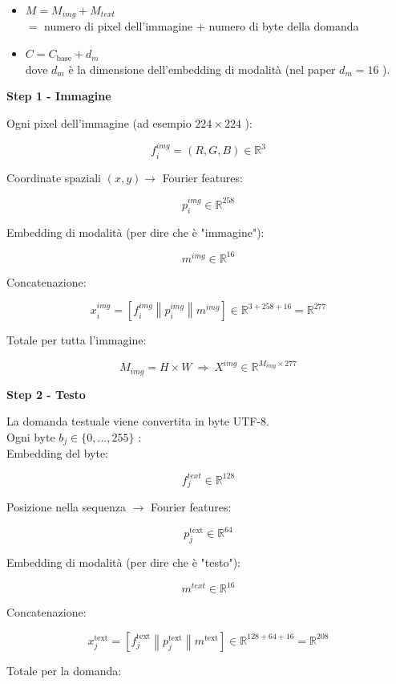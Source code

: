 \documentclass[
  11pt,
]{article}
\begin{document}
\begin{itemize}
\item
  \(M = M_{img} + M_{text}\)\\
  \(=\) numero di pixel dell'immagine + numero di byte
  della domanda
\item
  \(C = C_{\text{base}} + d_{m}\)\\
  dove \(d_{m}\) è la dimensione dell'embedding di
  modalità (nel paper \(d_{m} = 16\) ).
\end{itemize}

\textbf{Step 1 - Immagine}

Ogni pixel dell'immagine (ad esempio \(224 \times 224\)
):

\[f_{i}^{img} = (R,G,B) \in \mathbb{R}^{3}\]

Coordinate spaziali \((x,y) \rightarrow\) Fourier features:

\[p_{i}^{img} \in \mathbb{R}^{258}\]

Embedding di modalità (per dire che è "immagine"):

\[m^{img} \in \mathbb{R}^{16}\]

Concatenazione:

\[x_{i}^{img} = \left\lbrack f_{i}^{img}\left\| p_{i}^{img} \right\| m^{img} \right\rbrack \in \mathbb{R}^{3 + 258 + 16} = \mathbb{R}^{277}\]

Totale per tutta l'immagine:

\[M_{img} = H \times W\  \Rightarrow \ X^{img} \in \mathbb{R}^{M_{img} \times 277}\]

\textbf{Step 2 - Testo}

La domanda testuale viene convertita in byte UTF-8.\\
Ogni byte \(b_{j} \in \{ 0,\ldots,255\}\) :\\
Embedding del byte:

\[f_{j}^{text} \in \mathbb{R}^{128}\]

Posizione nella sequenza \(\rightarrow\) Fourier features:

\[p_{j}^{\text{text}} \in \mathbb{R}^{64}\]

Embedding di modalità (per dire che è "testo"):

\[m^{text} \in \mathbb{R}^{16}\]

Concatenazione:

\[x_{j}^{\text{text}} = \left\lbrack f_{j}^{\text{text}}\left\| p_{j}^{\text{text}} \right\| m^{\text{text}} \right\rbrack \in \mathbb{R}^{128 + 64 + 16} = \mathbb{R}^{208}\]

Totale per la domanda:
\end{document}
